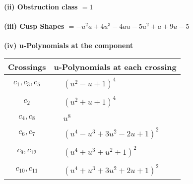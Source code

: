 \documentclass[1p]{elsarticle_modified}
\theoremstyle{definition}
\begin{document}
\flushleft \textbf{(ii) Obstruction class $= 1$}\\~\\
\flushleft \textbf{(iii) Cusp Shapes $= - u^2 a+4 u^3-4 a u-5 u^2+a+9 u-5$}\\~\\
\newpage\renewcommand{\arraystretch}{1}
\flushleft \textbf{(iv) u-Polynomials at the component}\newline \\
\begin{tabular}{m{50pt}|m{274pt}}
Crossings & \hspace{64pt}u-Polynomials at each crossing \\
\hline $$\begin{aligned}c_{1},c_{3},c_{5}\end{aligned}$$&$\begin{aligned}
&(u^2- u+1)^4
\end{aligned}$\\
\hline $$\begin{aligned}c_{2}\end{aligned}$$&$\begin{aligned}
&(u^2+u+1)^4
\end{aligned}$\\
\hline $$\begin{aligned}c_{4},c_{8}\end{aligned}$$&$\begin{aligned}
&u^8
\end{aligned}$\\
\hline $$\begin{aligned}c_{6},c_{7}\end{aligned}$$&$\begin{aligned}
&(u^4- u^3+3 u^2-2 u+1)^2
\end{aligned}$\\
\hline $$\begin{aligned}c_{9},c_{12}\end{aligned}$$&$\begin{aligned}
&(u^4+u^3+u^2+1)^2
\end{aligned}$\\
\hline $$\begin{aligned}c_{10},c_{11}\end{aligned}$$&$\begin{aligned}
&(u^4+u^3+3 u^2+2 u+1)^2
\end{aligned}$\\
\hline
\end{tabular}\\~\\
\end{document}
